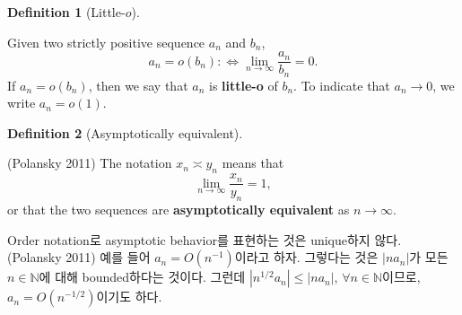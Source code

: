 \documentclass[
  13pt,
  letterpaper,
  DIV=11,
  numbers=noendperiod]{scrreprt}
\theoremstyle{definition}
\newtheorem{definition}{Definition}[chapter]
\theoremstyle{plain}
\theoremstyle{definition}
\theoremstyle{plain}
\theoremstyle{plain}
\theoremstyle{definition}
\theoremstyle{remark}
\begin{document}
\begin{definition}[Little-\(o\)]\protect\hypertarget{def-littleoh}{}\label{def-littleoh}

Given two strictly positive sequence \(a_n\) and \(b_n\), \[
a_n = o(b_n): \Longleftrightarrow \lim_{n\rightarrow\infty} \frac{a_n}{b_n} = 0.
\] If \(a_n = o(b_n)\), then we say that \(a_n\) is \textbf{little-o} of
\(b_n\). To indicate that \(a_n\rightarrow 0\), we write \(a_n = o(1)\).

\end{definition}

\begin{definition}[Asymptotically
equivalent]\protect\hypertarget{def-asymptequiv}{}\label{def-asymptequiv}

(Polansky 2011) The notation \(x_n \asymp y_n\) means that \[
\lim_{n\rightarrow\infty} \frac{x_n}{y_n}=1,
\] or that the two sequences are \textbf{asymptotically equivalent} as
\(n\rightarrow\infty\).

\end{definition}

\begin{tcolorbox}[enhanced jigsaw, colframe=quarto-callout-tip-color-frame, bottomtitle=1mm, opacitybacktitle=0.6, breakable, leftrule=.75mm, title=\textcolor{quarto-callout-tip-color}{\faLightbulb}\hspace{0.5em}{Remark}, colback=white, toprule=.15mm, toptitle=1mm, opacityback=0, arc=.35mm, rightrule=.15mm, bottomrule=.15mm, left=2mm, titlerule=0mm, coltitle=black, colbacktitle=quarto-callout-tip-color!10!white]

Order notation로 asymptotic behavior를 표현하는 것은 unique하지 않다.
(Polansky 2011) 예를 들어 \(a_n = O(n^{-1})\)이라고 하자. 그렇다는 것은
\(\vert n a_n \vert\)가 모든 \(n\in \mathbb{N}\)에 대해 bounded하다는
것이다. 그런데 \(|n^{1/2}a_n| \leq |na_n|\),
\(\forall n\in\mathbb{N}\)이므로, \(a_n = O(n^{-1/2})\)이기도 하다.

\end{tcolorbox}
\end{document}
